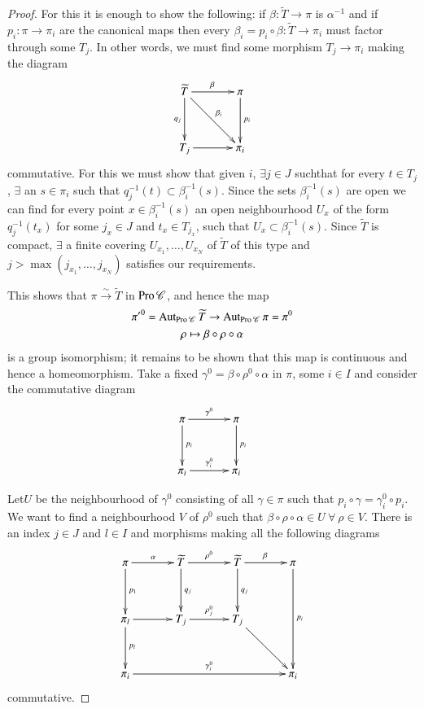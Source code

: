 \begin{proof}
For this it is enough to show the following: if
$\beta:\widetilde{T}\to \pi$ is $\alpha^{-1}$ and if $p_{i}:\pi\to
\pi_{i}$ are the canonical maps then every $\beta_{i}=p_{i}\circ
\beta:\widetilde{T}\to \pi_{i}$ must factor through some $T_{j}$. In
other words, we must find some morphism $T_{j}\to \pi_{i}$ making the
diagram 
\[
\xymatrix@=1.2cm{
\widetilde{T}\ar[dr]^{\beta_{i}}\ar[r]^{\beta}\ar[d]_{q_{j}} &
\pi\ar[d]^{p_{i}}\\ 
T_{j}\ar[r] & \pi_{i}
}
\]
commutative. For this we must show that given $i$, $\exists j\in J$
such\pageoriginale that for every $t\in T_{j}$, $\exists$ an
$s\in\pi_{i}$ such that $q^{-1}_{j}(t)\subset
\beta^{-1}_{i}(s)$. Since the sets $\beta^{-1}_{i}(s)$ are open we can
find for every point $x\in\beta^{-1}_{i}(s)$ an open neighbourhood
$U_{x}$ of the form $q^{-1}_{j}(t_{x})$ for some $j_{x}\in J$ and
$t_{x}\in T_{j_{x}}$, such that $U_{x}\subset
\beta^{-1}_{i}(s)$. Since $\widetilde{T}$ is compact, $\exists$ a
finite covering $U_{x_{1}},\ldots,U_{x_{N}}$ of $\widetilde{T}$ of
this type and $j>\max(j_{x_{1}},\ldots,j_{x_{N}})$ satisfies our
requirements. 

This shows that $\pi\xrightarrow{\sim}\widetilde{T}$ in
$\operatorname{Pro}\mathscr{C}$, and hence the map
\begin{gather*}
{\pi'}^{0}=\operatorname{Aut}_{\operatorname{Pro} \mathscr{C}}\widetilde{T}\to
\operatorname{Aut}_{\operatorname{Pro}\mathscr{C}}\pi=\pi^{0}\\
\rho\mapsto \beta\circ\rho\circ \alpha
\end{gather*}
is a group isomorphism; it remains to be shown that this map is
continuous and hence a homeomorphism. Take a fixed
$\gamma^{0}=\beta\circ \rho^{0}\circ \alpha$ in $\pi$, some $i\in I$
and consider the commutative diagram
\[
\xymatrix@=1.2cm{
\pi\ar[d]^{p_{i}}\ar[r]^{\gamma^{0}} & \pi\ar[d]^{p_{i}}\\
\pi_{i}\ar[r]^{\gamma^{0}_{i}} & \pi_{i}
}
\]

Let\pageoriginale $U$ be the neighbourhood of $\gamma^{0}$ consisting
of all $\gamma\in \pi$ such that $p_{i}\circ
\gamma=\gamma^{0}_{i}\circ p_{i}$. We want to find a neighbourhood $V$
of $\rho^{0}$ such that $\beta\circ \rho\circ \alpha\in U\ \forall\
\rho\in V$. There is an index $j\in J$ and $l\in I$ and morphisms
making all the following diagrams
\[
\xymatrix@=1.2cm{
\pi\ar[r]^{\alpha}\ar[d]^{p_{1}} &
\widetilde{T}\ar[r]^{\rho^{0}}\ar[d]^{q_{j}} &
\widetilde{T}\ar[d]^{q_{j}}\ar[r]^{\beta} & \pi\ar[dd]^{p_{i}}\\
\pi_{l}\ar[d]^{p_{l}}\ar[r] & T_{j}\ar[r]^{\rho^{0}_{j}} &
  T_{j}\ar[dr] & \\
\pi_{i}\ar[rrr]^{\gamma^{0}_{i}} & & & \pi_{i}
}
\]
commutative.


\end{proof}
